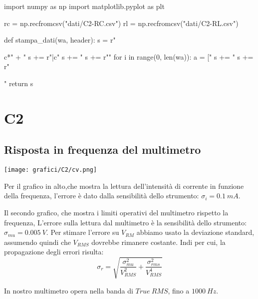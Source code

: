 \begin{sagesilent}
import numpy as np
import matplotlib.pyplot as plt

rc = np.recfromcsv("dati/C2-RC.csv")
rl = np.recfromcsv("dati/C2-RL.csv")



def stampa_dati(wa, header):
  s = r"\begin{tabular}{c*{" + "%
  s += r"}{|c}}"
  s += "%
  s += r"\midrule"
  for i in range(0, len(wa)):
    a = ["%
    s += "%
  s += r"\end{tabular}"
  return s
  
  

\end{sagesilent}



\chapter{C2}


\section{Risposta in frequenza del multimetro}



\begin{center}
\texttt{[image: grafici/C2/cv.png]} 
\end{center}

Per il grafico in alto,che mostra la lettura dell'intensità di corrente in funzione della frequenza, l'errore è dato dalla sensibilità dello strumento: $\sigma_i = 0.1\ mA$.
\

Il secondo grafico, che mostra i limiti operativi del multimetro rispetto la frequenza, L'errore sulla lettura dal multimetro è la sensibilità dello strumento: $\sigma_{mu} = 0.005\ V$. Per stimare l'errore su $V_{RM}$ abbiamo usato la deviazione standard, assumendo quindi che $V_{RMS}$ dovrebbe rimanere costante. 
Indi per cui, la propagazione degli errori risulta:
$$\sigma_r = \sqrt{\frac{\sigma_{mu}^2}{V_{RMS}^2} + \frac{\sigma_{rms}^2}{V_{RMS}^4}}$$


In nostro multimetro opera nella banda di $True\ RMS$, fino a  $1000\ Hz$.   

